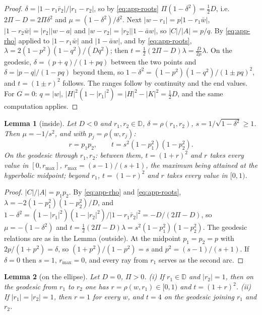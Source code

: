 \documentclass[11pt,reqno]{amsart}
\theoremstyle{plain}
\newtheorem*{lemma}{Lemma}
\theoremstyle{definition}
\theoremstyle{remark}
\begin{document}
\begin{proof}
$\delta=|1-r_1\bar r_2|/|r_1-r_2|$, so by \eqref{eq:app-roots} $\Pi(1-\delta^{2})=\frac12D$, i.e.\
$2\Pi-D=2\Pi\delta^{2}$ and $\mu=(1-\delta^{2})/\delta^{2}$. Next $|w-r_1|=p|1-r_1\bar w|$,
$|1-r_2\bar w|=|r_2||w-a|$ and $|w-r_2|=|r_2||1-\bar aw|$, so $|C|/|A|=p/q$. By \eqref{eq:app-rho} applied to
$|1-r_1\bar w|$ and $|1-\bar aw|$, and by \eqref{eq:app-roots},
$\lambda=2(1-p^{2})(1-q^{2})/(Dq^{2})$; then $t=\frac12(2\Pi-D)\lambda=\frac D{2\mu}\lambda$. On the
geodesic, $\delta=(p+q)/(1+pq)$ between the two points and $\delta=|p-q|/(1-pq)$ beyond them, so
$1-\delta^{2}=(1-p^{2})(1-q^{2})/(1\pm pq)^{2}$, and $t=(1\pm r)^{2}$ follows. The ranges follow by continuity
and the end values. For $G=0$: $q=|w|$, $|H|^{2}(1-|r_1|^{2})=|H|^{2}-|K|^{2}=\frac12D$, and the same computation
applies.
\end{proof}

\begin{lemma}[inside]
Let $D<0$ and $r_1,r_2\in\mathbb D$, $\delta=\rho(r_1,r_2)$, $s=1/\sqrt{1-\delta^{2}}\ge1$. Then
$\mu=-1/s^{2}$, and with $p_j=\rho(w,r_j)$:
\[
  r=p_1p_2,\qquad t=s^{2}(1-p_1^{2})(1-p_2^{2}) .
\]
On the geodesic through $r_1,r_2$: between them, $t=(1+r)^{2}$ and $r$ takes every value in
$[0,r_{\max}]$, $r_{\max}=(s-1)/(s+1)$, the maximum being attained at the hyperbolic midpoint; beyond $r_1$,
$t=(1-r)^{2}$ and $r$ takes every value in $[0,1)$.
\end{lemma}

\begin{proof}
$|C|/|A|=p_1p_2$. By \eqref{eq:app-rho} and \eqref{eq:app-roots}, $\lambda=-2(1-p_1^{2})(1-p_2^{2})/D$, and
$1-\delta^{2}=(1-|r_1|^{2})(1-|r_2|^{2})/|1-r_1\bar r_2|^{2}=-D/(2\Pi-D)$, so $\mu=-(1-\delta^{2})$ and
$t=\frac12(2\Pi-D)\lambda=s^{2}(1-p_1^{2})(1-p_2^{2})$. The geodesic relations are as in
the Lemma (outside). At the midpoint $p_1=p_2=p$ with $2p/(1+p^{2})=\delta$, so
$(1+p^{2})/(1-p^{2})=s$ and $p^{2}=(s-1)/(s+1)$. If $\delta=0$ then $s=1$, $r_{\max}=0$, and every ray
from $r_1$ serves as the second arc.
\end{proof}

\begin{lemma}[on the ellipse]
Let $D=0$, $\Pi>0$. \textup{(i)} If $r_1\in\mathbb D$ and $|r_2|=1$, then on the geodesic from $r_1$ to $r_2$
one has $r=\rho(w,r_1)\in[0,1)$ and $t=(1+r)^{2}$. \textup{(ii)} If $|r_1|=|r_2|=1$, then $r=1$ for every
$w$, and $t=4$ on the geodesic joining $r_1$ and $r_2$.
\end{lemma}
\end{document}
